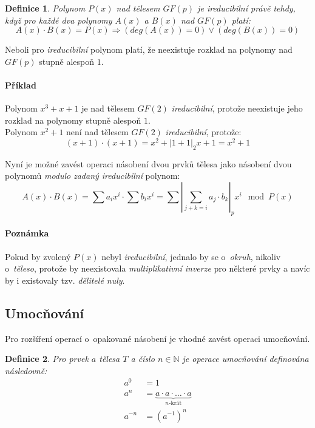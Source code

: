 \documentclass[thesis=M,czech,hidelinks]{FITthesis}[2012/06/26]
\newcommand{\0}{{\textcolor[gray]{0.80}{0}}}
\newtheorem{definice}{Definice}
\begin{document}
\begin{definice}
    Polynom $P(x)$ nad tělesem $GF(p)$ je \emph{ireducibilní} právě tehdy, když
    pro každé dva polynomy $A(x)$ a $B(x)$ nad $GF(p)$ platí:
    $$ A(x) \cdot B(x) = P(x) \Rightarrow \left( deg(A(x)) = 0 \right) \lor
    \left( deg(B(x)) = 0 \right)$$
\end{definice}

Neboli pro \emph{ireducibilní} polynom platí, že neexistuje rozklad na polynomy
nad $GF(p)$ stupně alespoň $1$.

\paragraph{Příklad} Polynom $x^3+x+1$ je nad tělesem $GF(2)$ \emph{ireducibilní},
protože neexistuje jeho rozklad na polynomy stupně alespoň $1$. \\
Polynom $x^2+1$ není nad tělesem $GF(2)$ \emph{ireducibilní}, protože:
$$(x+1)\cdot(x+1) = x^2 + \left|1+1\right|_2x + 1 = x^2+1 $$

Nyní je možné zavést operaci násobení dvou prvků tělesa jako násobení dvou
polynomů \emph{modulo} \emph{zadaný ireducibilní} polynom:
$$ A(x) \cdot B(x) = \sum a_i x^i \cdot \sum b_i x^i =
\sum \left|\sum_{j+k=i} a_j \cdot b_k\right|_p x^i \mod P(x) $$


\paragraph{Poznámka} Pokud by zvolený $P(x)$ nebyl \emph{ireducibilní}, jednalo
by se o~\emph{okruh}, nikoliv o~\emph{těleso}, protože by neexistovala
\emph{multiplikativní inverze} pro některé prvky a navíc by i existovaly
tzv. \emph{dělitelé nuly}.


\subsection{Umocňování}
Pro rozšíření operací o~opakované násobení je vhodné zavést operaci umocňování.

\begin{definice}
    Pro prvek $a$ tělesa $T$ a číslo $n\in\mathbb{N}$ je operace
    umocňování definována následovně:
    \begin{align*}
        a^0     &= 1 \\
        a^n     &= \underbrace{a \cdot a \cdot \ldots \cdot a}_{\text{$n$-krát}}\\
        a^{-n}  &= \left(a^{-1}\right)^n
    \end{align*}
\end{definice}
\end{document}
